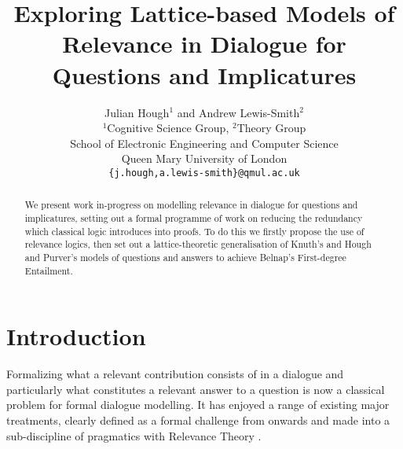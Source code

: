 \documentclass[11pt,a4paper]{article}
\title{Exploring Lattice-based Models of Relevance in Dialogue for Questions and Implicatures}
\author{Julian Hough$^{1}$ and Andrew Lewis-Smith$^{2}$ \\
  $^{1}$Cognitive Science Group, $^{2}$Theory Group\\
  School of Electronic Engineering and Computer Science \\
  Queen Mary University of London\\
   \texttt{\{j.hough,a.lewis-smith\}@qmul.ac.uk}}
\date{}
\theoremstyle{definition}
\begin{document}
\sloppy
\maketitle
\begin{abstract}
We present work in-progress  on modelling relevance in dialogue for questions and implicatures, setting out a formal programme of work on reducing the redundancy which classical logic introduces into proofs. To do this we firstly propose the use of relevance logics, then set out a lattice-theoretic generalisation of Knuth's and Hough and Purver's models of questions and answers to achieve Belnap's First-degree Entailment.
\end{abstract}



\section{Introduction}
Formalizing what a relevant contribution consists of in a dialogue and particularly what constitutes a relevant answer to a question is now a classical problem for formal dialogue modelling. It has enjoyed a range of existing major treatments, clearly defined as a formal challenge from  onwards and made into a sub-discipline of pragmatics with Relevance Theory \cite{SperberWilson1986}.
\end{document}
